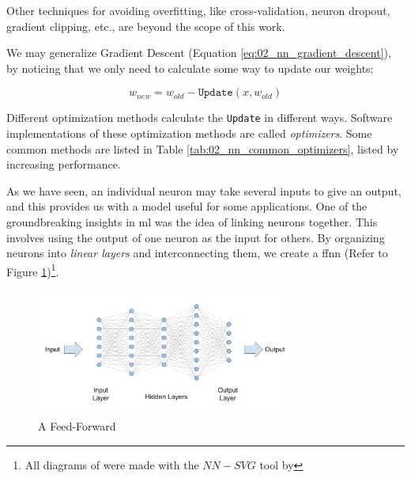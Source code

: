 Other techniques for avoiding overfitting, like cross-validation, neuron dropout, gradient clipping, etc., are beyond the scope of this work.

\label{02_nn_optimizers}

We may generalize Gradient Descent (Equation \ref{eq:02_nn_gradient_descent}), by noticing that we only need to calculate some way to update our weights:

\begin{equation}
    w_{new} = w_{old} - \texttt{Update}(x, w_{old})
\end{equation}

Different optimization methods calculate the \texttt{Update} in different ways. Software implementations of these optimization methods are called \emph{optimizers}. Some common methods are listed in Table \ref{tab:02_nn_common_optimizers}, listed by increasing performance.




\label{02_nn_ffnn}

As we have seen, an individual neuron may take several inputs to give an output, and this provides us with a model useful for some applications. 
One of the groundbreaking insights in \gls{ml} was the idea of linking neurons together. This involves using the output of one neuron as the input for others. By organizing neurons into \emph{linear layers} and interconnecting them, we create a \gls{ffnn} (Refer to Figure \ref{fig:02_nn_ffnn})\footnote{All diagrams of \neuralNetwork{} were made with the $NN-SVG$ tool by }.

\begin{figure}
    \centering
    \includegraphics[width=0.75\textwidth]{Figures/02/02_FFNN.png}
    \caption{A Feed-Forward \neuralNetwork{}}
    \label{fig:02_nn_ffnn}
\end{figure}

